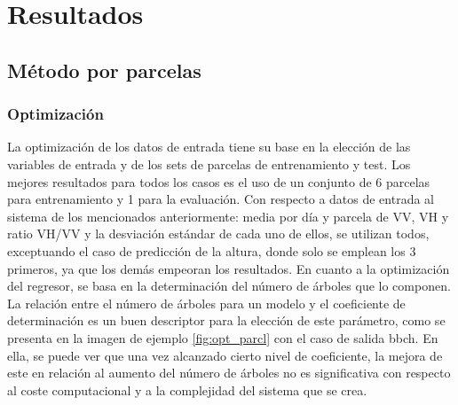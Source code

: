 
\chapter{Resultados}
\label{resultados}
\section{Método por parcelas}
\subsection{Optimización}
\par La optimización de los datos de entrada tiene su base en la elección de las variables de entrada y de los sets de parcelas de entrenamiento y test. Los mejores resultados para todos los casos es el uso de un conjunto de 6 parcelas para entrenamiento y 1 para la evaluación. Con respecto a datos de entrada al sistema de los mencionados anteriormente: media por día y parcela de VV, VH y ratio VH/VV y la desviación estándar de cada uno de ellos, se utilizan todos, exceptuando el caso de predicción de la altura, donde solo se emplean los 3 primeros, ya que los demás empeoran los resultados. En cuanto a la optimización del regresor, se basa en la determinación del número de árboles que lo componen. La relación entre el número de árboles para un modelo y el coeficiente de determinación es un buen descriptor para la elección de este parámetro, como se presenta en la imagen de ejemplo \ref{fig:opt_parcl} con el caso de salida \gls{bbch}. En ella, se puede ver que una vez alcanzado cierto nivel de coeficiente, la mejora de este en relación al aumento del número de árboles no es significativa con respecto al coste computacional y a la complejidad del sistema que se crea. 
